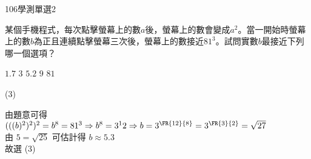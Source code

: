 \begin{QUESTIONS}
\begin{QUESTION}
\begin{QSOLLIST}
        \end{QSOLLIST}
        \begin{QEMPTYSPACE}
        \end{QEMPTYSPACE}
    \end{QUESTION}
    \begin{QUESTION}
        \begin{ExamInfo}{106}{學測}{單選}{2}
        \end{ExamInfo}
        \begin{ExamAnsRateInfo}{51}{84}{52}{17}
        \end{ExamAnsRateInfo}
        \begin{QBODY}
            某個手機程式，每次點擊螢幕上的數$a$後，螢幕上的數會變成${{a}^{2}}$。當一開始時螢幕上的數$b$為正且連續點擊螢幕三次後，螢幕上的數接近${{81}^{3}}$。試問實數$b$最接近下列哪一個選項？
			\begin{QOPS}
				\QOP $1.7$      
				\QOP $3$      
				\QOP $5.2$      
				\QOP $9$      
				\QOP $81$
			\end{QOPS}
        \end{QBODY}
        \begin{QFROMS}
        \end{QFROMS}
        \begin{QTAGS}\end{QTAGS}
        \begin{QANS}
            (3)
        \end{QANS}
        \begin{QSOLLIST}
            \begin{QSOL}[SOLID=22]
                由題意可得 $(((b)^2)^2)^2 = b^8 = 81^3 \Rightarrow b^8 = 3^12 \Rightarrow b=3^{\FR{12}{8}} = 3^{\FR{3}{2}} = \sqrt{27} $ \\
                由 $5=\sqrt{25}$ 可估計得 $b \approx 5.3$ \\
                故選 (3)
            \end{QSOL}


\end{QSOLLIST}
\end{QUESTION}
\end{QUESTIONS}
